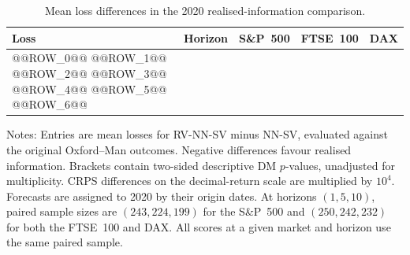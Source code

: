 \begin{table}[htbp]
\centering
\begin{threeparttable}
\caption{Mean loss differences in the 2020 realised-information comparison.}
\label{tab:subsample-scores}
\small
\setlength{\tabcolsep}{3pt}
\begin{tabular*}{\textwidth}{@{\extracolsep{\fill}}llrrr@{}}
\toprule
Loss & Horizon & S\&P~500 & FTSE~100 & DAX \\
\midrule
@@ROW_0@@
@@ROW_1@@
@@ROW_2@@
@@ROW_3@@
@@ROW_4@@
@@ROW_5@@
@@ROW_6@@
\bottomrule
\end{tabular*}
\begin{tablenotes}[flushleft]
\footnotesize
\item Notes: Entries are mean losses for RV-NN-SV minus NN-SV, evaluated against the original Oxford--Man outcomes. Negative differences favour realised information. Brackets contain two-sided descriptive DM $p$-values, unadjusted for multiplicity. CRPS differences on the decimal-return scale are multiplied by $10^4$. Forecasts are assigned to 2020 by their origin dates. At horizons $(1,5,10)$, paired sample sizes are $(243,224,199)$ for the S\&P~500 and $(250,242,232)$ for both the FTSE~100 and DAX. All scores at a given market and horizon use the same paired sample.
\end{tablenotes}
\end{threeparttable}
\end{table}
